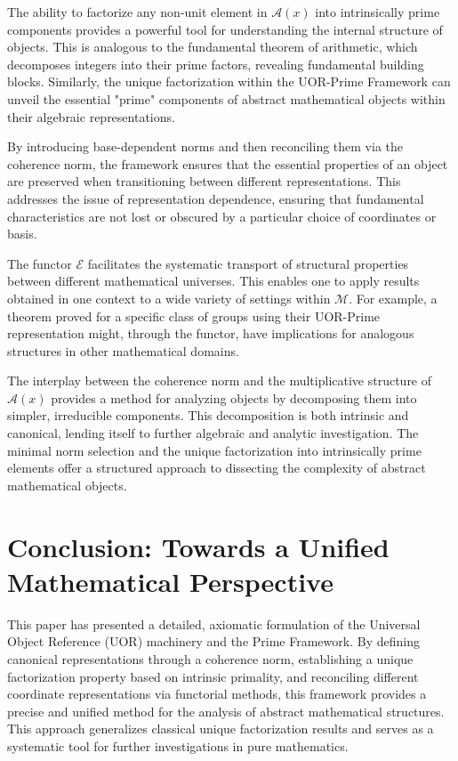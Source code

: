 \documentclass{article}
\begin{document}
The ability to factorize any non-unit element in $\mathcal{A}(x)$ into intrinsically prime components provides a powerful tool for understanding the internal structure of objects. This is analogous to the fundamental theorem of arithmetic, which decomposes integers into their prime factors, revealing fundamental building blocks. Similarly, the unique factorization within the UOR-Prime Framework can unveil the essential "prime" components of abstract mathematical objects within their algebraic representations.

By introducing base-dependent norms and then reconciling them via the coherence norm, the framework ensures that the essential properties of an object are preserved when transitioning between different representations. This addresses the issue of representation dependence, ensuring that fundamental characteristics are not lost or obscured by a particular choice of coordinates or basis.

The functor $\mathcal{E}$ facilitates the systematic transport of structural properties between different mathematical universes. This enables one to apply results obtained in one context to a wide variety of settings within $\mathcal{M}$. For example, a theorem proved for a specific class of groups using their UOR-Prime representation might, through the functor, have implications for analogous structures in other mathematical domains.

The interplay between the coherence norm and the multiplicative structure of $\mathcal{A}(x)$ provides a method for analyzing objects by decomposing them into simpler, irreducible components. This decomposition is both intrinsic and canonical, lending itself to further algebraic and analytic investigation. The minimal norm selection and the unique factorization into intrinsically prime elements offer a structured approach to dissecting the complexity of abstract mathematical objects.

\section{Conclusion: Towards a Unified Mathematical Perspective}

This paper has presented a detailed, axiomatic formulation of the Universal Object Reference (UOR) machinery and the Prime Framework. By defining canonical representations through a coherence norm, establishing a unique factorization property based on intrinsic primality, and reconciling different coordinate representations via functorial methods, this framework provides a precise and unified method for the analysis of abstract mathematical structures. This approach generalizes classical unique factorization results and serves as a systematic tool for further investigations in pure mathematics.
\end{document}
